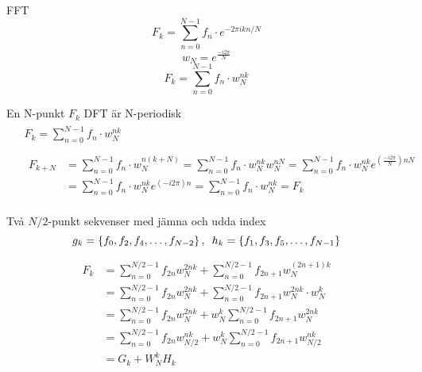 \documentclass[presentation]{beamer}
\begin{document}
\begin{frame}[label={sec:org57455f6}]{FFT}
\[ F_{k} = \sum_{n=0}^{N-1} f_{n} \cdot e^{-2 \pi i kn/N}\]
\pause
\[ w_{N} = e^{\frac{-i2 \pi}{N}} \]
\pause
\[ F_{k} = \sum_{n=0}^{N-1} f_{n} \cdot w_{N}^{nk} \]
\end{frame}

\begin{frame}[label={sec:org43e5576}]{En N-punkt \(F_{k}\) DFT är N-periodisk}
\begin{align*}
&\begin{aligned}
  F_{k} = \sum_{n=0}^{N-1}f_{n} \cdot w_{N}^{nk}
\end{aligned} \\
&\begin{aligned}
  \begin{aligned}
  F_{k+N} &= \sum_{n=0}^{N-1}f_{n} \cdot w_{N}^{n(k+N)} = \sum_{n=0}^{N-1}f_{n} \cdot w_{N}^{nk}w_{N}^{nN} = \sum_{n=0}^{N-1}f_{n} \cdot w_{N}^{nk}e^{(\frac{-i2
          \pi}{N}) nN} \\
        &= \sum_{n=0}^{N-1}f_{n} \cdot w_{N}^{nk}e^{(-i2 \pi)n} =
    \sum_{n=0}^{N-1}f_{n} \cdot w_{N}^{nk} = F_{k}
    \end{aligned}
\end{aligned}
\end{align*}
\end{frame}

\begin{frame}[label={sec:orgbb9d639}]{Två \(N/2\)-punkt sekvenser med jämna och udda index}
\[
  g_{k} = \left\{f_{0}, f_{2}, f_{4}, \dots, f_{N-2}\right\}, \hspace{0.5em}
  h_{k} = \left\{f_{1}, f_{3}, f_{5}, \dots, f_{N-1}\right\} 
\]

\begin{align*}
F_{k} &= \sum_{n=0}^{N/2 - 1}f_{2n}w_{N}^{2nk} + \sum_{n=0}^{N/2 -
  1}f_{2n + 1}w_{N}^{(2n+1)k} \\
  &= \sum_{n=0}^{N/2 - 1}f_{2n}w_{N}^{2nk} + \sum_{n=0}^{N/2 -
    1}f_{2n+1} w_{N}^{2nk} \cdot w_{N}^{k} \\
    &= \sum_{n=0}^{N/2 - 1}f_{2n}w_{N}^{2nk} + w_{N}^{k} \sum_{n=0}^{N/2 -
      1}f_{2n+1} w_{N}^{2nk} \\
      &= \sum_{n=0}^{N/2 - 1}f_{2n}w_{N/2}^{nk} + w_{N}^{k} \sum_{n=0}^{N/2 -
        1}f_{2n+1} w_{N/2}^{nk} \\
  & = G_{k} + W_{N}^{k}H_{k}
\end{align*}
\end{frame}
\end{document}

